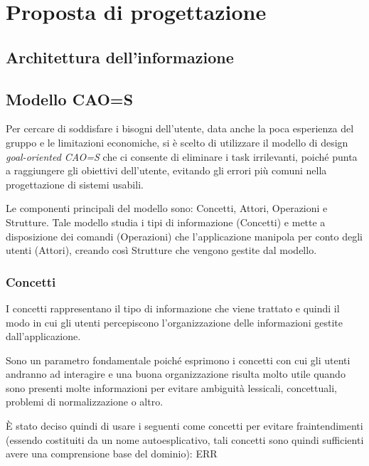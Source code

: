 \documentclass[12pt,italian,]{report}
\begin{document}
\hypertarget{proposta-di-progettazione}{%
\chapter{Proposta di progettazione}\label{proposta-di-progettazione}}

\hypertarget{architettura-dellinformazione}{%
\section{Architettura
dell'informazione}\label{architettura-dellinformazione}}

\hypertarget{modello-caos}{%
\section{Modello CAO=S}\label{modello-caos}}

Per cercare di soddisfare i bisogni dell'utente, data anche la poca
esperienza del gruppo e le limitazioni economiche, si è scelto di
utilizzare il modello di design \emph{goal-oriented CAO=S} che ci
consente di eliminare i task irrilevanti, poiché punta a raggiungere gli
obiettivi dell'utente, evitando gli errori più comuni nella
progettazione di sistemi usabili.

Le componenti principali del modello sono: Concetti, Attori,
Operazioni e Strutture. Tale modello studia i tipi di informazione
(Concetti) e mette a disposizione dei comandi (Operazioni) che
l'applicazione manipola per conto degli utenti (Attori), creando così
Strutture che vengono gestite dal modello.

\hypertarget{concetti}{%
\subsection{Concetti}\label{concetti}}

I concetti rappresentano il tipo di informazione che viene trattato e
quindi il modo in cui gli utenti percepiscono l'organizzazione delle
informazioni gestite dall'applicazione.

Sono un parametro fondamentale poiché esprimono i concetti con cui gli
utenti andranno ad interagire e una buona organizzazione risulta molto
utile quando sono presenti molte informazioni per evitare ambiguità
lessicali, concettuali, problemi di normalizzazione o altro.

È stato deciso quindi di usare i seguenti come concetti per evitare
fraintendimenti (essendo costituiti da un nome autoesplicativo, tali
concetti sono quindi sufficienti avere una comprensione base del
dominio): ERR
\end{document}
